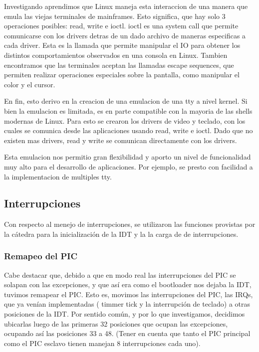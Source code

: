 \documentclass[a4paper,10pt]{article}
\begin{document}
    Investigando aprendimos que Linux maneja esta interaccion de una manera que emula las viejas terminales de mainframes. 
    Esto significa, que hay solo 3 operaciones posibles: read, write e ioctl.
    ioctl es una system call que permite comunicarse con los drivers detras de un dado archivo de maneras especificas a cada driver.
    Esta es la llamada que permite manipular el IO para obtener los distintos comportamientos observados en una consola en Linux.
    Tambien encontramos que las terminales aceptan las llamadas escape sequences, que permiten realizar operaciones especiales sobre la pantalla, como manipular el color y el cursor.

    En fin, esto derivo en la creacion de una emulacion de una tty a nivel kernel.
    Si bien la emulacion es limitada, es en parte compatible con la mayoria de las shells modernas de Linux.
    Para esto se crearon los drivers de video y teclado, con los cuales se comunica desde las aplicaciones usando read, write e ioctl.
    Dado que no existen mas drivers, read y write se comunican directamente con los drivers.

    Esta emulacion nos permitio gran flexibilidad y aporto un nivel de funcionalidad muy alto para el desarrollo de aplicaciones.
    Por ejemplo, se presto con facilidad a la implementacion de multiples tty.

    \subsection{Interrupciones}
    Con respecto al menejo de interrupciones, se utilizaron las funciones provistas por la cátedra para la inicialización de la IDT y la
    la carga de de interrupciones.
    \subsubsection{Remapeo del PIC}
    Cabe destacar que, debido a que en modo real las interrupciones del PIC se solapan con las excepciones, y que así era como el bootloader
    nos dejaba la IDT, tuvimos remapear el PIC. Esto es, movimos las interrupciones del PIC, las IRQs, que ya venían implementadas 
    ( timmer tick y la interrupción de teclado) a otras posiciones de la IDT. Por sentido común, y por lo que investigamos, decidimos
    ubicarlas luego de las primeras 32 posiciones que ocupan las excepciones, ocupando así las posiciones 33 a 48. (Tener en cuenta
    que tanto el PIC principal como el PIC esclavo tienen manejan 8 interrupciones cada uno).
    
\end{document}
